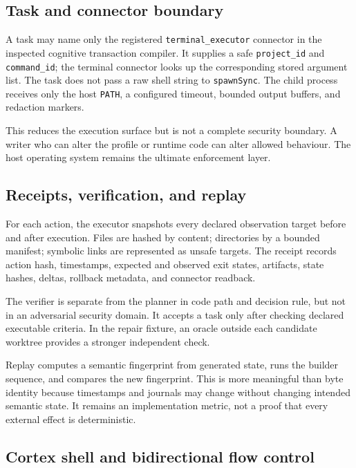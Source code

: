 \documentclass[10pt,twocolumn]{article}
\theoremstyle{definition}
\theoremstyle{plain}
\theoremstyle{remark}
\newcommand{\file}[1]{\nolinkurl{#1}}
\begin{document}
\subsection{Task and connector boundary}

A task may name only the registered \file{terminal_executor} connector in the inspected cognitive transaction compiler.  It supplies a safe \file{project_id} and \file{command_id}; the terminal connector looks up the corresponding stored argument list.  The task does not pass a raw shell string to \file{spawnSync}.  The child process receives only the host \file{PATH}, a configured timeout, bounded output buffers, and redaction markers.

This reduces the execution surface but is not a complete security boundary.  A writer who can alter the profile or runtime code can alter allowed behaviour.  The host operating system remains the ultimate enforcement layer.

\subsection{Receipts, verification, and replay}

For each action, the executor snapshots every declared observation target before and after execution.  Files are hashed by content; directories by a bounded manifest; symbolic links are represented as unsafe targets.  The receipt records action hash, timestamps, expected and observed exit states, artifacts, state hashes, deltas, rollback metadata, and connector readback.

The verifier is separate from the planner in code path and decision rule, but not in an adversarial security domain.  It accepts a task only after checking declared executable criteria.  In the repair fixture, an oracle outside each candidate worktree provides a stronger independent check.

Replay computes a semantic fingerprint from generated state, runs the builder sequence, and compares the new fingerprint.  This is more meaningful than byte identity because timestamps and journals may change without changing intended semantic state.  It remains an implementation metric, not a proof that every external effect is deterministic.

\subsection{Cortex shell and bidirectional flow control}
\label{sec:shell}
\end{document}
